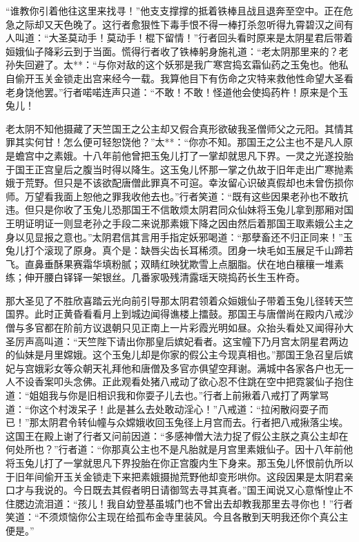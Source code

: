 \documentclass[12pt,UTF8]{ctexbook}
\begin{document}
{	“谁教你引着他往这里来找寻！”他支支撑撑的抵着铁棒且战且退奔至空中。正在危急之际却又天色晚了。这行者愈狠性下毒手恨不得一棒打杀忽听得九霄碧汉之间有人叫道：“大圣莫动手！莫动手！棍下留情！”行者回头看时原来是太阴星君后带着姮娥仙子降彩云到于当面。慌得行者收了铁棒躬身施礼道：“老太阴那里来的？老孙失回避了。太**：“与你对敌的这个妖邪是我广寒宫捣玄霜仙药之玉兔也。他私自偷开玉关金锁走出宫来经今一载。我算他目下有伤命之灾特来救他性命望大圣看老身饶他罢。”行者喏喏连声只道：“不敢！不敢！怪道他会使捣药杵！原来是个玉兔儿！
	
	老太阴不知他摄藏了天竺国王之公主却又假合真形欲破我圣僧师父之元阳。其情其罪其实何甘！怎么便可轻恕饶他？”太**：“你亦不知。那国王之公主也不是凡人原是蟾宫中之素娥。十八年前他曾把玉兔儿打了一掌却就思凡下界。一灵之光遂投胎于国王正宫皇后之腹当时得以降生。这玉兔儿怀那一掌之仇故于旧年走出广寒抛素娥于荒野。但只是不该欲配唐僧此罪真不可逭。幸汝留心识破真假却也未曾伤损你师。万望看我面上恕他之罪我收他去也。”行者笑道：“既有这些因果老孙也不敢抗违。但只是你收了玉兔儿恐那国王不信敢烦太阴君同众仙妹将玉兔儿拿到那厢对国王明证明证一则显老孙之手段二来说那素娥下降之因由然后着那国王取素娥公主之身以见显报之意也。”太阴君信其言用手指定妖邪喝道：“那孽畜还不归正同来！”玉兔儿打个滚现了原身。真个是：缺唇尖齿长耳稀须。团身一块毛如玉展足千山蹄若飞。直鼻垂酥果赛霜华填粉腻；双睛红映犹欺雪上点胭脂。伏在地白穰穰一堆素练；伸开腰白铎铎一架银丝。几番家吸残清露瑶天晓捣药长生玉杵奇。
	
	那大圣见了不胜欣喜踏云光向前引导那太阴君领着众姮娥仙子带着玉兔儿径转天竺国界。此时正黄昏看看月上到城边闻得谯楼上擂鼓。那国王与唐僧尚在殿内八戒沙僧与多官都在阶前方议退朝只见正南上一片彩霞光明如昼。众抬头看处又闻得孙大圣厉声高叫道：“天竺陛下请出你那皇后嫔妃看者。这宝幢下乃月宫太阴星君两边的仙妹是月里嫦娥。这个玉兔儿却是你家的假公主今现真相也。”那国王急召皇后嫔妃与宫娥彩女等众朝天礼拜他和唐僧及多官亦俱望空拜谢。满城中各家各户也无一人不设香案叩头念佛。正此观看处猪八戒动了欲心忍不住跳在空中把霓裳仙子抱住道：“姐姐我与你是旧相识我和你耍子儿去也。”行者上前揪着八戒打了两掌骂道：“你这个村泼呆子！此是甚么去处敢动淫心！”八戒道：“拉闲散闷耍子而已！”那太阴君令转仙幢与众嫦娥收回玉兔径上月宫而去。行者把八戒揪落尘埃。这国王在殿上谢了行者又问前因道：“多感神僧大法力捉了假公主朕之真公主却在何处所也？”行者道：“你那真公主也不是凡胎就是月宫里素娥仙子。因十八年前他将玉兔儿打了一掌就思凡下界投胎在你正宫腹内生下身来。那玉兔儿怀恨前仇所以于旧年间偷开玉关金锁走下来把素娥摄抛荒野他却变形哄你。这段因果是太阴君亲口才与我说的。今日既去其假者明日请御驾去寻其真者。”国王闻说又心意惭惶止不住腮边流泪道：“孩儿！我自幼登基虽城门也不曾出去却教我那里去寻你也！”行者笑道：“不须烦恼你公主现在给孤布金寺里装风。今且各散到天明我还你个真公主便是。”
	
}
\end{document}
